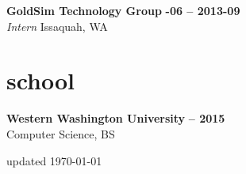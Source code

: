 \documentclass[margin,10pt]{res}
\begin{document}
\begin{resume}
    \textbf{GoldSim Technology Group} \hfill \textsc{\bfseries{}-06 -- 2013-09}\\
    \textit{Intern} \hfill Issaquah, WA 

\section{\sc \lsstyle school}
    \textbf{Western Washington University} \hfill \textsc{\bfseries{} -- 2015}\\
    Computer Science, BS

\end{resume}
\begin{minipage}[t]{\textwidth}
    \flushright
    \small
    \sc \lsstyle
    \hfill updated \today
\end{minipage}
\end{document}
